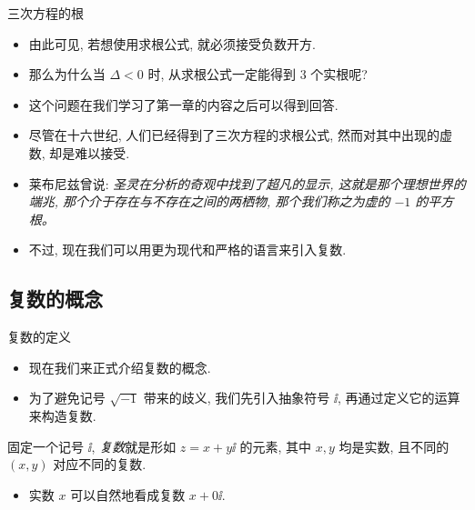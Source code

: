 

\begin{frame}{三次方程的根\noexer}
	\begin{itemize}
		\item 由此可见, 若想使用求根公式, 就\alert{必须接受负数开方}.
		\item 那么为什么当 $\Delta<0$ 时, 从求根公式一定能得到 $3$ 个实根呢?
		\item 这个问题在我们学习了第一章的内容之后可以得到回答.
		\item 尽管在十六世纪, 人们已经得到了三次方程的求根公式, 然而对其中出现的虚数, 却是难以接受.
		\item 莱布尼兹曾说: {\color{third}\itshape 圣灵在分析的奇观中找到了超凡的显示, 这就是那个理想世界的端兆, 那个介于存在与不存在之间的两栖物, 那个我们称之为虚的 $-1$ 的平方根。}
		\item 不过, 现在我们可以用更为现代和严格的语言来引入复数.
	\end{itemize}
\end{frame}

\subsection{复数的概念}

\begin{frame}{复数的定义}
	\begin{itemize}
		\item 现在我们来正式介绍复数的概念.
		\item 为了避免记号 $\sqrt{-1}$ 带来的歧义, 我们先引入抽象符号 $\ii$, 再通过定义它的运算来构造复数.
	\end{itemize}
	\onslide<+->
	\begin{definition}
		固定一个记号 $\ii$, \emph{复数}就是形如 $z=x+y\ii$ 的元素, 其中 $x,y$ 均是实数, 且不同的 $(x,y)$ 对应不同的复数.
	\end{definition}
	\begin{itemize}
		\item 实数 $x$ 可以自然地看成复数 $x+0\ii$.
	\end{itemize}
\end{frame}


